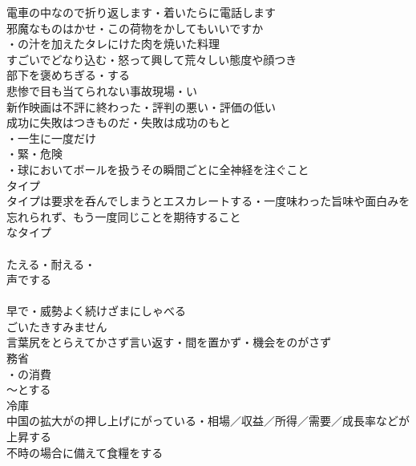 電車の中なので折り返します・着いたらに電話します\\
邪魔なものはかせ・この荷物をかしてもいいですか\\
・の汁を加えたタレにけた肉を焼いた料理\\
すごいでどなり込む・怒って興して荒々しい態度や顔つき\\
部下を褒めちぎる・する\\
悲惨で目も当てられない事故現場・い\\
新作映画は不評に終わった・評判の悪い・評価の低い\\
成功に失敗はつきものだ・失敗は成功のもと\\
・一生に一度だけ\\
・緊・危険\\
・球においてボールを扱うその瞬間ごとに全神経を注ぐこと\\

タイプ\\
タイプは要求を呑んでしまうとエスカレートする・一度味わった旨味や面白みを忘れられず、もう一度同じことを期待すること\\
なタイプ\\
\\
たえる・耐える・\\
声でする\\
\\
早で・威勢よく続けざまにしゃべる\\
ごいたきすみません\\
言葉尻をとらえてかさず言い返す・間を置かず・機会をのがさず\\

務省\\
・の消費\\
〜とする\\
冷庫\\
中国の拡大がの押し上げにがっている・相場／収益／所得／需要／成長率などが上昇する\\
不時の場合に備えて食糧をする\\
